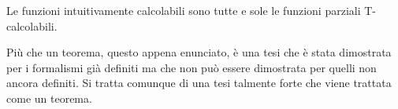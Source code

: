 \begin{theorem} \label{th: church-turing}
	Le funzioni intuitivamente calcolabili sono tutte e sole
	le funzioni parziali T-calcolabili.
\end{theorem}

Più che un teorema, questo appena enunciato, è una tesi che è
stata dimostrata per i formalismi già definiti ma che non può
essere dimostrata per quelli non ancora definiti. Si tratta
comunque di una tesi talmente forte che viene trattata come un
teorema.

